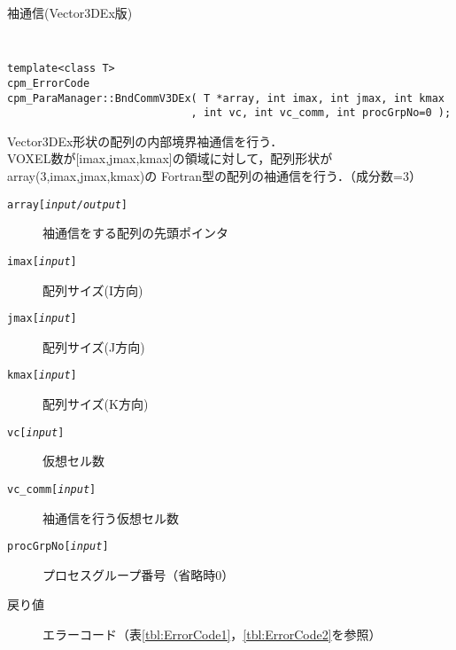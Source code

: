 \begin{spacing}{0.8}
\begin{itembox}[l]{袖通信(Vector3DEx版)}
{\tt
\begin{verbatim}
template<class T>
cpm_ErrorCode
cpm_ParaManager::BndCommV3DEx( T *array, int imax, int jmax, int kmax
                             , int vc, int vc_comm, int procGrpNo=0 );
\end{verbatim}
}
Vector3DEx形状の配列の内部境界袖通信を行う．\\
VOXEL数が[imax,jmax,kmax]の領域に対して，配列形状がarray(3,imax,jmax,kmax)の
Fortran型の配列の袖通信を行う．（成分数=3）
\begin{description}
\item[{\tt array[{\it input/output}]}] 袖通信をする配列の先頭ポインタ
\item[{\tt imax[{\it input}]}] 配列サイズ(I方向)
\item[{\tt jmax[{\it input}]}] 配列サイズ(J方向)
\item[{\tt kmax[{\it input}]}] 配列サイズ(K方向)
\item[{\tt vc[{\it input}]}] 仮想セル数
\item[{\tt vc\_comm[{\it input}]}] 袖通信を行う仮想セル数
\item[{\tt procGrpNo[{\it input}]}] プロセスグループ番号（省略時0）
\\
\item[戻り値] エラーコード（表\ref{tbl:ErrorCode1}，\ref{tbl:ErrorCode2}を参照）
\end{description}
\end{itembox}\\
\end{spacing}

